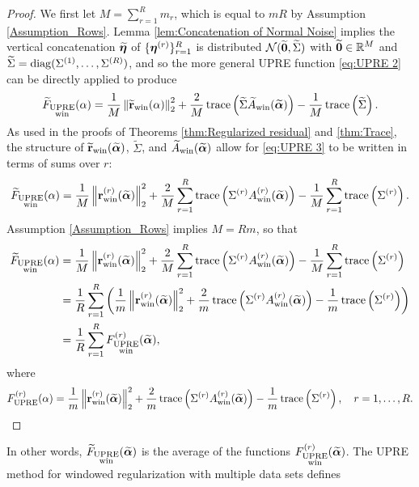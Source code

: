 \documentclass[12pt]{article}
\begin{document}
\begin{proof}
We first let $M = \sum_{r=1}^R m_r$, which is equal to $mR$ by Assumption \ref{Assumption_Rows}. Lemma \ref{lem:Concatenation of Normal Noise} implies the vertical concatenation $\widetilde{\bm{\eta}}$ of $\{\bm{\eta}^{(r)}\}_{r=1}^R$ is distributed $\mathcal{N}(\widetilde{\bm{0}},\widetilde{\Sigma})$ with $\widetilde{\bm{0}} \in \mathbb{R}^M$ and $\widetilde{\Sigma} = \operatorname{diag}(\Sigma^{(1)},\ldots,\Sigma^{(R)})$, and so the more general UPRE function \eqref{eq:UPRE 2} can be directly applied to produce
\begin{equation}
\label{eq:UPRE 3}
\widetilde{F}_{\substack{\text{UPRE} \\ \text{win}}}(\alpha) = \frac{1}{M}\left\|\widetilde{\mathbf{r}}_{\text{win}}(\alpha)\right\|_2^2 + \frac{2}{M}\operatorname{trace}\left(\widetilde{\Sigma}\widetilde{A}_{\text{win}}(\widetilde{\bm{\alpha}})\right) - \frac{1}{M}\operatorname{trace}\left(\widetilde{\Sigma}\right).
\end{equation}
As used in the proofs of Theorems \ref{thm:Regularized residual} and \ref{thm:Trace}, the structure of $\widetilde{\mathbf{r}}_{\text{win}}(\widetilde{\bm{\alpha}})$, $\widetilde{\Sigma}$, and $\widetilde{A}_{\text{win}}(\widetilde{\bm{\alpha}})$ allow for \eqref{eq:UPRE 3} to be written in terms of sums over $r$:
\begin{equation}
\label{eq:UPRE 4}
\widetilde{F}_{\substack{\text{UPRE} \\ \text{win}}}(\alpha) = \frac{1}{M}\left\|\mathbf{r}_{\text{win}}^{(r)}(\widetilde{\bm{\alpha}})\right\|_2^2 + \frac{2}{M} \sum_{r=1}^R \operatorname{trace}\left(\Sigma^{(r)}A_{\text{win}}^{(r)}(\widetilde{\bm{\alpha}})\right) - \frac{1}{M} \sum_{r=1}^R \operatorname{trace}\left(\Sigma^{(r)}\right).
\end{equation}
Assumption \ref{Assumption_Rows} implies $M = Rm$, so that
\begin{align*}
\widetilde{F}_{\substack{\text{UPRE} \\ \text{win}}}(\alpha) &= \frac{1}{M}\left\|\mathbf{r}_{\text{win}}^{(r)}(\widetilde{\bm{\alpha}})\right\|_2^2 + \frac{2}{M} \sum_{r=1}^R \operatorname{trace}\left(\Sigma^{(r)}A_{\text{win}}^{(r)}(\widetilde{\bm{\alpha}})\right) - \frac{1}{M} \sum_{r=1}^R \operatorname{trace}\left(\Sigma^{(r)}\right) \\
&= \frac{1}{R} \sum_{r=1}^R \left(\frac{1}{m}\left\|\mathbf{r}_{\text{win}}^{(r)}(\widetilde{\bm{\alpha}})\right\|_2^2 + \frac{2}{m} \operatorname{trace}\left(\Sigma^{(r)} A_{\text{win}}^{(r)}(\widetilde{\bm{\alpha}})\right) - \frac{1}{m} \operatorname{trace}\left(\Sigma^{(r)}\right)\right) \\
&= \frac{1}{R} \sum_{r=1}^R F_{\substack{\text{UPRE} \\ \text{win}}}^{(r)}(\widetilde{\bm{\alpha}}),
\end{align*}
where
\[F_{\text{UPRE}}^{(r)}(\alpha) = \frac{1}{m}\left\|\mathbf{r}_{\text{win}}^{(r)}(\widetilde{\bm{\alpha}})\right\|_2^2 + \frac{2}{m} \operatorname{trace}\left(\Sigma^{(r)} A_{\text{win}}^{(r)}(\widetilde{\bm{\alpha}})\right) - \frac{1}{m} \operatorname{trace}\left(\Sigma^{(r)}\right), \quad r = 1,\ldots,R.\]
\end{proof}
\noindent In other words, $\widetilde{F}_{\substack{\text{UPRE} \\ \text{win}}}(\widetilde{\bm{\alpha}})$ is the average of the functions $F_{\substack{\text{UPRE} \\ \text{win}}}^{(r)}(\widetilde{\bm{\alpha}})$. The UPRE method for windowed regularization with multiple data sets defines
\end{document}
